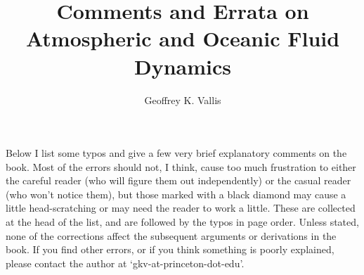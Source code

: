 \documentclass[10pt]{article}
\begin{document}
\title{\sffamily Comments and Errata on Atmospheric and Oceanic Fluid Dynamics}
\author{\sffamily Geoffrey K. Vallis}
\maketitle
%

\noindent Below I list some typos and give a few very brief explanatory comments on the book. Most of the errors should not, I think, cause too much frustration to either the careful reader (who will figure them out independently) or the casual reader (who won't notice them), but those marked with a black diamond may cause a little head-scratching or may need the reader to work a little. These are collected at the head of the list, and are followed by the typos in page order. Unless stated, none of the corrections affect the subsequent arguments or derivations in the book. If you find other errors, or if you think something is poorly explained, please contact the author at `gkv-at-princeton-dot-edu'.
\end{document}
